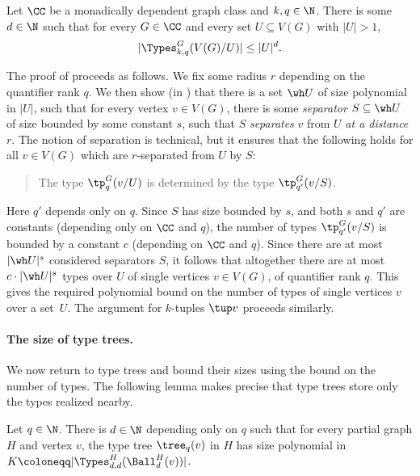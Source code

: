 \begin{theorem}\label{thm:ov-type-bound}
  Let $\CC$ be a monadically dependent graph class and $k,q\in\N$. There is some $d\in\N$ such that for every $G\in\CC$ and every set $U\subseteq V(G)$ with $|U|>1$,
  $$|\Types^G_{k,q}(V(G)/U)|\le |U|^d.$$
\end{theorem}

The proof of  proceeds as follows. We fix some radius $r$ depending on the quantifier rank $q$.
We then show (in )  that there is a set $\wh U$ of size polynomial in $|U|$,
such that for every vertex $v\in V(G)$,
there is some  \emph{separator} $S\subseteq \wh U$ of size bounded by some constant $s$,
such that $S$ \emph{separates} $v$ from $U$ \emph{at a distance} $r$.
The notion of separation is technical,
but it ensures that the following holds
for all $v\in V(G)$ which are $r$-separated from $U$ by $S$:
\begin{quote}\centering
The type $\tp^G_q(v/U)$ is determined by the type $\tp^G_{q'}(v/S)$.
\end{quote}
Here $q'$ depends only on $q$.
Since $S$ has size bounded by $s$, and both $s$ and $q'$ are constants (depending only on $\CC$ and $q$),
the number of types $\tp^G_{q'}(v/S)$ is bounded by a constant $c$ (depending on $\CC$ and $q$). Since there are at most $|\wh U|^s$ considered separators $S$, it follows that altogether there are at most $c\cdot |\wh U|^s$  types over $U$ of single vertices $v\in V(G)$, of quantifier rank $q$. This gives the required polynomial bound on the number of types of single vertices $v$ over a set~$U$. The argument for $k$-tuples $\tup v$ proceeds similarly.

\paragraph{The size of type trees.}
We now return to type trees and bound their sizes using the bound on the number of types.
The following lemma makes precise that type trees store only the types realized nearby.

\begin{lemma}\label{lem:ov-tree-size}
  Let $q\in\N$. There is $d\in\N$ depending only on $q$ such that for every partial graph $H$ and vertex $v$,
  the type tree $\tree_q(v)$ in $H$ has size polynomial in $K\coloneqq|\Types^H_{d,d}(\Ball^H_d(v))|$.
\end{lemma}

